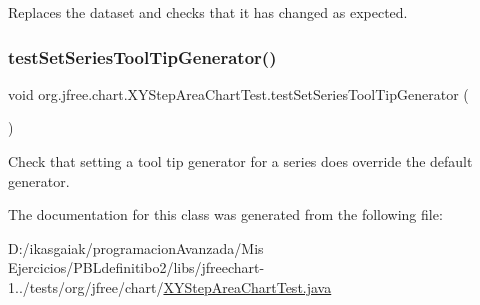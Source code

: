 Replaces the dataset and checks that it has changed as expected. \mbox{\label{classorg_1_1jfree_1_1chart_1_1_x_y_step_area_chart_test_a90d028a10a8fc3a3d507cdf1132d7332}} 
\subsubsection{\texorpdfstring{test\+Set\+Series\+Tool\+Tip\+Generator()}{testSetSeriesToolTipGenerator()}}
{\footnotesize\ttfamily void org.\+jfree.\+chart.\+X\+Y\+Step\+Area\+Chart\+Test.\+test\+Set\+Series\+Tool\+Tip\+Generator (\begin{DoxyParamCaption}{ }\end{DoxyParamCaption})}

Check that setting a tool tip generator for a series does override the default generator. 

The documentation for this class was generated from the following file\+:\begin{DoxyCompactItemize}
\item 
D\+:/ikasgaiak/programacion\+Avanzada/\+Mis Ejercicios/\+P\+B\+Ldefinitibo2/libs/jfreechart-\/1../tests/org/jfree/chart/\mbox{\hyperlink{_x_y_step_area_chart_test_8java}{X\+Y\+Step\+Area\+Chart\+Test.\+java}}\end{DoxyCompactItemize}

